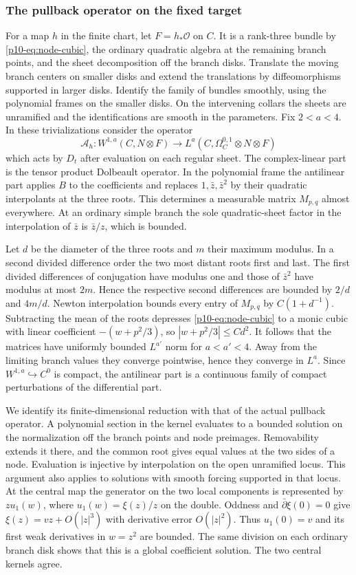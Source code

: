 \subsubsection{The pullback operator on the fixed target}

For a map $h$ in the finite chart, let $F=h_*\mathcal O$ on $C$. It is
a rank-three bundle by \eqref{p10-eq:node-cubic}, the ordinary quadratic
algebra at the remaining branch points, and the sheet decomposition off
the branch disks. Translate the moving branch centers on smaller disks
and extend the translations by diffeomorphisms supported in larger
disks. Identify the family of bundles smoothly, using the polynomial
frames on the smaller disks. On the intervening collars the sheets are
unramified and the identifications are smooth in the parameters.
Fix $2<a<4$. In these trivializations consider the operator
\[
  \mathcal A_h:W^{1,a}(C,N\otimes F)\longrightarrow
       L^a(C,\Omega_C^{0,1}\otimes N\otimes F)
\]
which acts by $D_t$ after evaluation on each regular sheet. The
complex-linear part is the tensor product Dolbeault operator. In the
polynomial frame the antilinear part applies $B$ to the coefficients
and replaces $1,\bar z,\bar z^2$ by their quadratic interpolants at
the three roots. This determines a measurable matrix $M_{p,q}$ almost
everywhere. At an ordinary simple branch the sole quadratic-sheet
factor in the interpolation of $\bar z$ is $\bar z/z$, which is bounded.

Let $d$ be the diameter of the three roots and $m$ their maximum
modulus. In a second divided difference order the two most distant
roots first and last. The first divided differences of conjugation have
modulus one and those of $\bar z^2$ have modulus at most $2m$. Hence
the respective second differences are bounded by $2/d$ and $4m/d$.
Newton interpolation bounds every entry of $M_{p,q}$ by $C(1+d^{-1})$.
Subtracting the mean of the roots depresses \eqref{p10-eq:node-cubic} to a
monic cubic with linear coefficient $-(w+p^2/3)$, so
$|w+p^2/3|\le C d^2$. It follows that the matrices have uniformly bounded
$L^{a'}$ norm for $a<a'<4$. Away from the limiting branch values they
converge pointwise, hence they converge in $L^a$. Since
$W^{1,a}\hookrightarrow C^0$ is compact, the antilinear part is a
continuous family of compact perturbations of the differential part.

We identify its finite-dimensional reduction with that of the actual
pullback operator. A polynomial section in the kernel evaluates to a
bounded solution on the normalization off the branch points and node
preimages. Removability extends it there, and the common root gives
equal values at the two sides of a node. Evaluation is injective by
interpolation on the open unramified locus. This argument also applies
to solutions with smooth forcing supported in that locus. At the
central map the generator on the two local components is represented
by $z u_1(w)$, where $u_1(w)=\xi(z)/z$ on the double. Oddness and
$\bar\partial\xi(0)=0$ give $\xi(z)=v z+O(|z|^3)$ with derivative
error $O(|z|^2)$. Thus $u_1(0)=v$ and its first weak derivatives in
$w=z^2$ are bounded. The same division on each ordinary branch disk
shows that this is a global coefficient solution. The two central
kernels agree.

